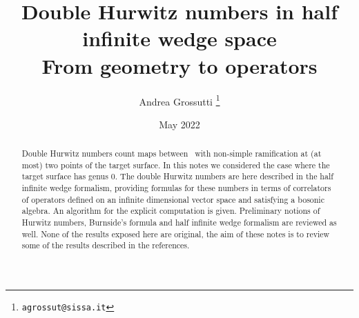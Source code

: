 \documentclass[a4paper,11pt,twoside,openright,leqno]{article}
\title{Double Hurwitz numbers in half infinite wedge space \\{\Large From geometry to operators}}
\author{Andrea Grossutti%
	\thanks{\texttt{agrossut@sissa.it}}}
\affil{SISSA}
\date{May 2022}
\theoremstyle{definition}
\theoremstyle{remark}
\begin{document}

\begin{titlepage}
\maketitle
\end{titlepage}

\begin{abstract}
Double Hurwitz numbers count maps between \rss\ with non-simple ramification at (at most) two points of the target surface. In this notes we considered the case where the target surface has genus 0. The double Hurwitz numbers are here described in the half infinite wedge formalism, providing formulas for these numbers in terms of correlators of operators defined on an infinite dimensional vector space and satisfying a bosonic algebra. An algorithm for the explicit computation is given. Preliminary notions of Hurwitz numbers, Burnside's formula and half infinite wedge formalism are reviewed as well. None of the results exposed here are original, the aim of these notes is to review some of the results described in the references. 
\end{abstract}

\thispagestyle{empty}
\tableofcontents



%

\appendix
%

\nocite{*}
\printbibliography[heading=bibintoc]
\end{document}
